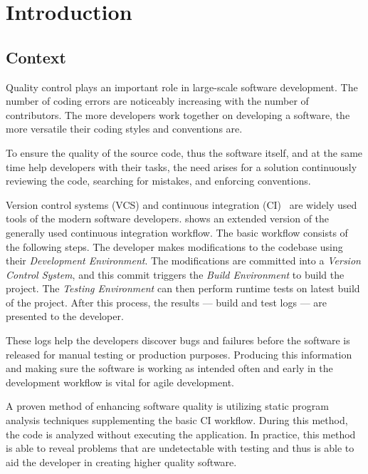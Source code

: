 \chapter{Introduction}
\label{chap:introduction}

\section{Context}

Quality control plays an important role in large-scale software development. The number of coding errors are noticeably increasing with the number of contributors. The more developers work together on developing a software, the more versatile their coding styles and conventions are.

To ensure the quality of the source code, thus the software itself, and at the same time help developers with their tasks, the need arises for a solution continuously reviewing the code, searching for mistakes, and enforcing conventions.



Version control systems (VCS) and continuous integration (CI)~\cite{CI} are widely used tools of the modern software developers.  shows an extended version of the generally used continuous integration workflow.
The basic workflow consists of the following steps. The developer makes modifications to the codebase using their \textit{Development Environment}. The modifications are committed into a \textit{Version Control System}, and this commit triggers the \textit{Build Environment} to build the project. The \textit{Testing Environment} can then perform runtime tests on latest build of the project. After this process, the results --- build and test logs --- are presented to the developer.

These logs help the developers discover bugs and failures before the software is released for manual testing or production purposes. Producing this information and making sure the software is working as intended often and early in the development workflow is vital for agile development.

A proven method of enhancing software quality is utilizing static program analysis techniques supplementing the basic CI workflow. During this method, the code is analyzed without executing the application. In practice, this method is able to reveal problems that are undetectable with testing and thus is able to aid the developer in creating higher quality software.


